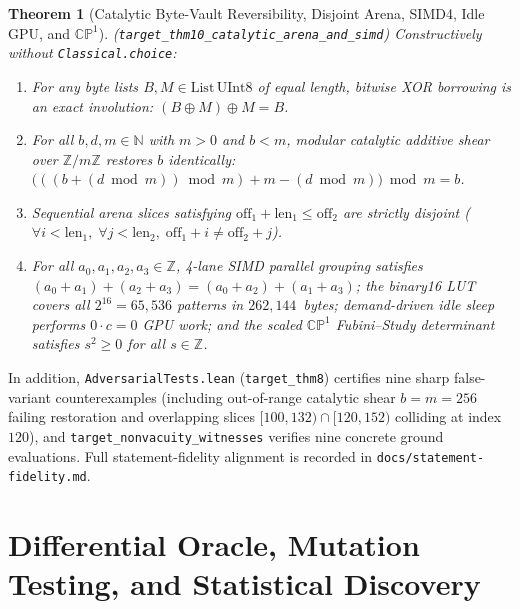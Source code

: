 \documentclass[11pt,a4paper]{amsart}
\newcommand{\code}[1]{{\small\nolinkurl{#1}}}
\newtheorem{theorem}{Theorem}[section]
\theoremstyle{remark}
\newcommand{\Z}{\mathbb{Z}}
\newcommand{\N}{\mathbb{N}}
\begin{document}
\begin{theorem}[Catalytic Byte-Vault Reversibility, Disjoint Arena, SIMD4, Idle GPU, and $\mathbb{CP}^1$]
\label{thm:catalytic}
\textup{(\code{target_thm10_catalytic_arena_and_simd})}
Constructively without \code{Classical.choice}:
\begin{enumerate}
  \item For any byte lists $B, M \in \mathrm{List}\,\mathrm{UInt8}$ of equal
  length, bitwise XOR borrowing is an exact involution: $(B \oplus M) \oplus M = B$.
  \item For all $b, d, m \in \N$ with $m > 0$ and $b < m$, modular catalytic
  additive shear over $\Z/m\Z$ restores $b$ identically:
  $\bigl(((b + (d \bmod m)) \bmod m) + m - (d \bmod m)\bigr) \bmod m = b$.
  \item Sequential arena slices satisfying $\mathrm{off}_1 + \mathrm{len}_1 \le \mathrm{off}_2$
  are strictly disjoint ($\forall i < \mathrm{len}_1,\; \forall j < \mathrm{len}_2,\;
  \mathrm{off}_1 + i \ne \mathrm{off}_2 + j$).
  \item For all $a_0, a_1, a_2, a_3 \in \Z$, 4-lane SIMD parallel grouping
  satisfies $(a_0 + a_1) + (a_2 + a_3) = (a_0 + a_2) + (a_1 + a_3)$; the
  binary16 LUT covers all $2^{16} = 65{,}536$ patterns in $262{,}144$~bytes;
  demand-driven idle sleep performs $0 \cdot c = 0$ GPU work; and the scaled
  $\mathbb{CP}^1$ Fubini--Study determinant satisfies $s^2 \ge 0$ for all $s \in \Z$.
\end{enumerate}
\end{theorem}

In addition, \code{AdversarialTests.lean} (\code{target_thm8}) certifies
nine sharp false-variant counterexamples (including out-of-range catalytic
shear $b = m = 256$ failing restoration and overlapping slices $[100,132) \cap
[120,152)$ colliding at index $120$), and \code{target_nonvacuity_witnesses}
verifies nine concrete ground evaluations. Full statement-fidelity alignment is
recorded in \code{docs/statement-fidelity.md}.

\section{Differential Oracle, Mutation Testing, and Statistical Discovery}
\end{document}
